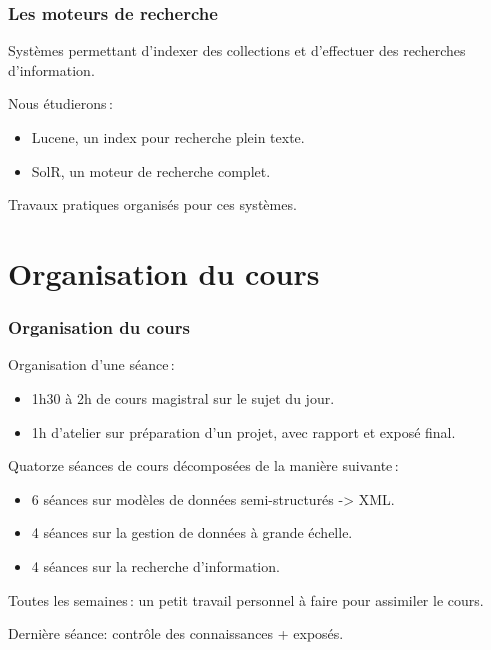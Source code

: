 \begin{frame}
\frametitle{Les moteurs de recherche}

Systèmes permettant d'indexer des collections et d'effectuer des recherches d'information.

\vfill

Nous étudierons\,:
\begin{itemize}
   \item Lucene, un index pour recherche plein texte.
     \item SolR, un moteur de recherche complet.
\end{itemize}

\vfill

Travaux pratiques organisés pour ces systèmes.

\end{frame}

\section{Organisation du cours}

\begin{frame}
\frametitle{Organisation du cours}

Organisation d'une séance\,:

\begin{itemize}
  \item 1h30 à 2h de cours magistral sur le sujet du jour.
  \item 1h d'atelier sur préparation d'un projet, avec rapport et exposé final.
\end{itemize}

Quatorze séances de cours décomposées de la manière suivante\,:
\begin{itemize}
  \item 6 séances sur modèles de données semi-structurés -> XML.
  \item 4 séances sur la gestion de données à grande échelle.
  \item 4 séances sur la recherche d'information.
\end{itemize}

\vfill
\alert{Toutes les semaines\,:} un petit travail personnel à faire pour assimiler le cours.

\vfill

Dernière séance: contrôle des connaissances + exposés.
\end{frame}


